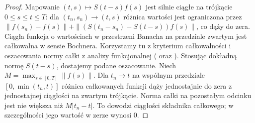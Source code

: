 \begin{proof}
Mapowanie $(t,s)\mapsto S(t-s)f(s)$ jest silnie ciągłe
na trójkącie $0\le s\le t\le T$: dla $(t_n,s_n)\to(t,s)$
różnica wartości jest ograniczona przez
$\|f(s_n)-f(s)\|+\|(S(t_n-s_n)-S(t-s))f(s)\|$,
co dąży do zera. Ciągła funkcja o wartościach w przestrzeni
Banacha na przedziale zwartym jest całkowalna w sensie
Bochnera. Korzystamy tu z kryterium całkowalności
i oszacowania normy całki z analizy funkcjonalnej
( oraz
). Stosując dokładną normę $S(t-s)$, dostajemy
podane oszacowanie.
Niech $M=\max_{s\in[0,T]}\|f(s)\|$. Dla $t_n\to t$
na wspólnym przedziale $[0,\min(t_n,t)]$ różnica
całkowanych funkcji dąży jednostajnie do zera
z jednostajnej ciągłości na zwartym trójkącie.
Norma całki na pozostałym odcinku jest nie większa
niż $M|t_n-t|$. To dowodzi ciągłości składnika całkowego;
w szczególności jego wartość w zerze wynosi $0$.


\end{proof}
